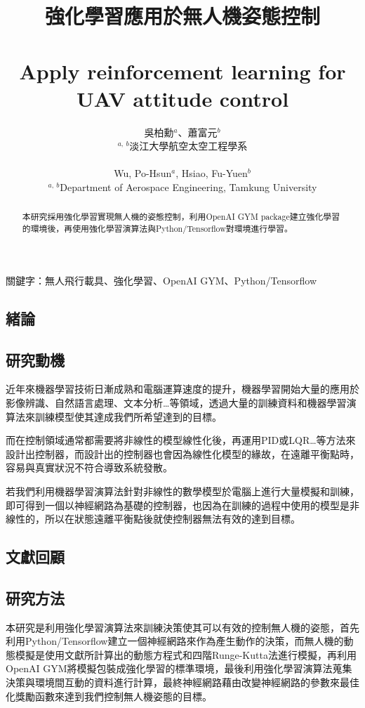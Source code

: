 \documentclass[a4paper, onecolumn, 11pt, AutoFakeBold]{article}
\title{\textfourteen
    \textbf{強化學習應用於無人機姿態控制}\\
    \ \\
    \textbf{Apply reinforcement learning for UAV attitude control}
}
\author{\texttwelve
    吳柏勳$^{a}$、蕭富元$^{b}$\\
    $^{a,\ b}$淡江大學航空太空工程學系\\
    \ \\
    Wu, Po-Hsun$^{a}$, Hsiao, Fu-Yuen$^{b}$\\
    $^{a,\ b}$Department of Aerospace Engineering, Tamkung University
}
\date{}
\newcommand{\textpt}[1]{\fontsize{#1}{#1}\selectfont}
\begin{document}
\maketitle
\thispagestyle{fancy}

\begin{abstract} \textpt{11}
本研究採用強化學習實現無人機的姿態控制，利用OpenAI GYM package建立強化學習的環境後，再使用強化學習演算法與Python/Tensorflow對環境進行學習。
\end{abstract}
\smallskip

關鍵字：無人飛行載具、強化學習、OpenAI GYM、Python/Tensorflow
\smallskip

\begin{multicols*}{2}

\section{緒論}
\subsection{研究動機}
\par
近年來機器學習技術日漸成熟和電腦運算速度的提升，機器學習開始大量的應用於影像辨識、自然語言處理、文本分析…等領域，透過大量的訓練資料和機器學習演算法來訓練模型使其達成我們所希望達到的目標。
\par
而在控制領域通常都需要將非線性的模型線性化後，再運用PID或LQR…等方法來設計出控制器，而設計出的控制器也會因為線性化模型的緣故，在遠離平衡點時，容易與真實狀況不符合導致系統發散。
\par
若我們利用機器學習演算法針對非線性的數學模型於電腦上進行大量模擬和訓練，即可得到一個以神經網路為基礎的控制器，也因為在訓練的過程中使用的模型是非線性的，所以在狀態遠離平衡點後就使控制器無法有效的達到目標。

\smallskip
\subsection{文獻回顧}
\cite{Flight_Controller_Synthesis_Via_Deep_Reinforcement_Learning}
\cite{Reinforcement_Learning_for_UAV_Attitude_Control}
\cite{Optimal_Sliding_Mode_Controller_for_Fixed-wing_UAV}

\blindtext

\smallskip
\subsection{研究方法}
\par
本研究是利用強化學習演算法來訓練決策使其可以有效的控制無人機的姿態，首先利用Python/Tensorflow建立一個神經網路來作為產生動作的決策，而無人機的動態模擬是使用文獻\cite{Optimal_Sliding_Mode_Controller_for_Fixed-wing_UAV}所計算出的動態方程式和四階Runge-Kutta法進行模擬，再利用OpenAI GYM將模擬包裝成強化學習的標準環境，最後利用強化學習演算法蒐集決策與環境間互動的資料進行計算，最終神經網路藉由改變神經網路的參數來最佳化獎勵函數來達到我們控制無人機姿態的目標。


\end{multicols*}
\end{document}
